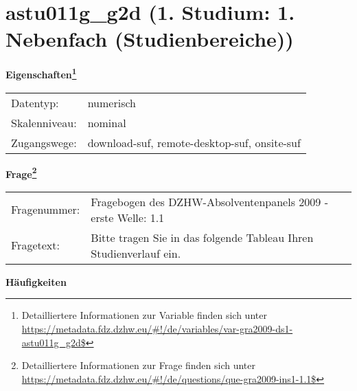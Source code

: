
    \setcounter{footnote}{0}

    \vspace*{-1.8cm}
	\section{astu011g\_g2d (1. Studium: 1. Nebenfach (Studienbereiche))}
	\label{section:astu011g_g2d}



    \vspace*{0.5cm}
    \noindent\textbf{Eigenschaften\footnote{Detailliertere Informationen zur Variable finden sich unter
		\url{https://metadata.fdz.dzhw.eu/\#!/de/variables/var-gra2009-ds1-astu011g_g2d$}}}\\
	\begin{tabularx}{\hsize}{@{}lX}
	Datentyp: & numerisch \\
	Skalenniveau: & nominal \\
	Zugangswege: &
	  download-suf, 
	  remote-desktop-suf, 
	  onsite-suf
 \\
    \end{tabularx}



				\vspace*{0.5cm}
                \noindent\textbf{Frage\footnote{Detailliertere Informationen zur Frage finden sich unter
		              \url{https://metadata.fdz.dzhw.eu/\#!/de/questions/que-gra2009-ins1-1.1$}}}\\
				\begin{tabularx}{\hsize}{@{}lX}
					Fragenummer: &
					  Fragebogen des DZHW-Absolventenpanels 2009 - erste Welle:
					  1.1
 \\
					Fragetext: & Bitte tragen Sie in das folgende Tableau Ihren Studienverlauf ein. \\
				\end{tabularx}





        		\vspace*{0.5cm}
                \noindent\textbf{Häufigkeiten}

